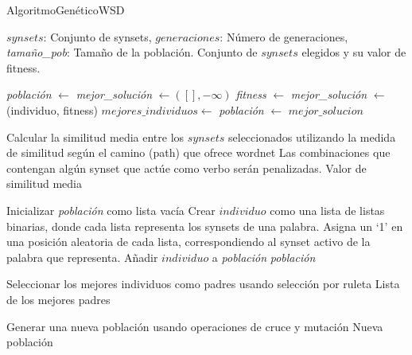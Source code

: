 \documentclass{article}
\begin{document}
	\begin{algorithm}
		\caption{AlgoritmoGenéticoWSD}
		\begin{algorithmic}[1]
			\scriptsize
			\Require $synsets$: Conjunto de synsets, $generaciones$: Número de generaciones, \textit{tama\~no\_pob}: Tamaño de la población.
			\Ensure Conjunto de $synsets$ elegidos y su valor de fitness.
			
			\State \textit{poblaci\'on} $\gets$ 
			\State \textit{mejor\_soluci\'on} $\gets ([], -\infty)$  
				\State \textit{fitness} $\gets$  
				\State \textit{mejor\_soluci\'on} $\gets$ (individuo, fitness)
				\EndIf
			\EndFor
			\State $mejores\_individuos \gets$ 
			\State \textit{poblaci\'on} $\gets$ 
			\EndFor
			\State \Return $mejor\_solucion$
			\EndFunction
			
			\State Calcular la similitud media entre los $synsets$ seleccionados utilizando la medida de similitud seg\'un el camino (path) que ofrece wordnet
			\State Las combinaciones que contengan alg\'un synset que act\'ue como verbo ser\'an penalizadas.
			\State \Return Valor de similitud media
			\EndFunction
			
			\State Inicializar \textit{poblaci\'on} como lista vacía
			\State Crear $individuo$ como una lista de listas binarias, donde cada lista representa los synsets de una palabra. Asigna un `1' en una posición aleatoria de cada lista, correspondiendo al synset activo de la palabra que representa.
			\State Añadir $individuo$ a \textit{poblaci\'on}
			\EndFor
			\State \Return \textit{poblaci\'on}
			\EndFunction
			
			\State Seleccionar los mejores individuos como padres usando selección por ruleta
			\State \Return Lista de los mejores padres
			\EndFunction
			
			\State Generar una nueva población usando operaciones de cruce y mutación
			\State \Return Nueva población
			\EndFunction
			

\end{algorithmic}
\end{algorithm}
\end{document}
